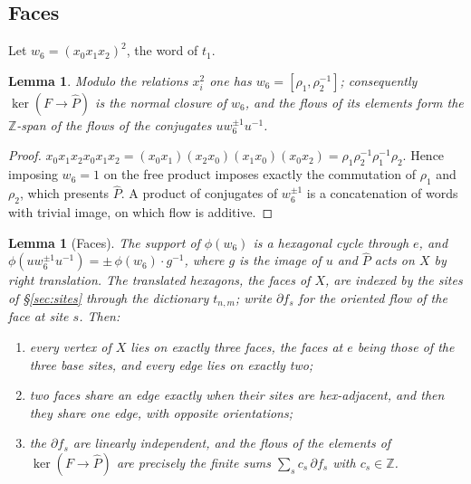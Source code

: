 \documentclass[11pt]{article}
\newtheorem{lemma}[theorem]{Lemma}
\theoremstyle{definition}
\theoremstyle{remark}
\newcommand{\Z}{\mathbb{Z}}
\begin{document}
\subsection{Faces}

Let $w_6=(x_0x_1x_2)^2$, the word of $t_1$.

\begin{lemma}\label{lem:kernel}
Modulo the relations $x_i^2$ one has $w_6=[\rho_1,\rho_2^{-1}]$; consequently
$\ker(F\to\widehat P)$ is the normal closure of $w_6$, and the flows of its
elements form the $\Z$-span of the flows of the conjugates $uw_6^{\pm1}u^{-1}$.
\end{lemma}

\begin{proof}
$x_0x_1x_2x_0x_1x_2=(x_0x_1)(x_2x_0)(x_1x_0)(x_0x_2)
=\rho_1\rho_2^{-1}\rho_1^{-1}\rho_2$. Hence imposing $w_6=1$ on the free
product imposes exactly the commutation of $\rho_1$ and $\rho_2$, which
presents $\widehat P$. A product of conjugates of $w_6^{\pm1}$ is a
concatenation of words with trivial image, on which flow is additive.
\end{proof}

\begin{lemma}[Faces]\label{lem:faces}
The support of $\phi(w_6)$ is a hexagonal cycle through $e$, and
$\phi(uw_6^{\pm1}u^{-1})=\pm\,\phi(w_6)\cdot g^{-1}$, where $g$ is the image
of $u$ and $\widehat P$ acts on $X$ by right translation. The translated
hexagons, the \emph{faces} of $X$, are indexed by the sites of
\S\ref{sec:sites} through the dictionary $t_{n,m}$; write $\partial f_s$ for
the oriented flow of the face at site $s$. Then:
\begin{enumerate}
\item[(i)] every vertex of $X$ lies on exactly three faces, the faces at $e$
being those of the three base sites, and every edge lies on exactly two;
\item[(ii)] two faces share an edge exactly when their sites are
hex-adjacent, and then they share one edge, with opposite orientations;
\item[(iii)] the $\partial f_s$ are linearly independent, and the flows of
the elements of $\ker(F\to\widehat P)$ are precisely the finite sums
$\sum_s c_s\,\partial f_s$ with $c_s\in\Z$.
\end{enumerate}
\end{lemma}
\end{document}
